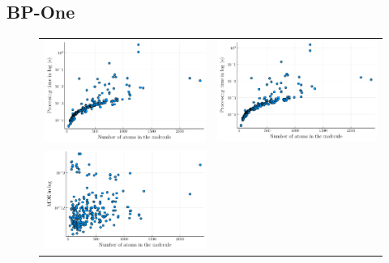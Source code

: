 \documentclass[a4paper,11pt]{article}
\begin{document}
	\subsection{BP-One}
	\begin{figure}[H]
		\begin{tabular}{cc}
			\includegraphics[scale=0.55]{figures/timeMatrix.pdf} & 
			\includegraphics[scale=0.55]{figures/timeQuaternion.pdf} \\
			\includegraphics[scale=0.55]{figures/MDEMatrix.pdf} &

\end{tabular}
\end{figure}
\end{document}
